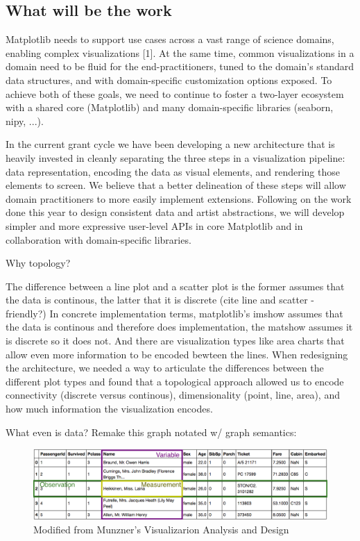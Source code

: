 \documentclass[letterpaper,onecolumn,titlepage]{Ythesis}
\begin{document}
 \subsection{What will be the work}
 Matplotlib needs to support use cases across a vast range of science domains, enabling complex visualizations [1]. At the same time, common visualizations in a domain need to be fluid for the end-practitioners, tuned to the domain's standard data structures, and with domain-specific customization options exposed. To achieve both of these goals, we need to continue to foster a two-layer ecosystem with a shared core (Matplotlib) and many domain-specific libraries (seaborn, nipy, ...).

In the current grant cycle we have been developing a new architecture that is heavily invested in cleanly separating the three steps in a visualization pipeline: data representation, encoding the data as visual elements, and rendering those elements to screen. We believe that a better delineation of these steps will allow domain practitioners to more easily implement extensions. Following on the work done this year to design consistent data and artist abstractions, we will develop simpler and more expressive user-level APIs in core Matplotlib and in collaboration with domain-specific libraries. 



 Why topology?

 The difference between a line plot and a scatter plot is the former assumes that the data is continous, the latter that it is discrete (cite line and scatter - friendly?) In concrete implementation terms, matplotlib's imshow assumes that the data is continous and therefore does implementation, the matshow assumes it is discrete so it does not. And there are visualization types like area charts that allow even more information to be encoded bewteen the lines. When redesigning the architecture, we needed a way to articulate the differences between the different plot types and found that a topological approach allowed us to encode connectivity (discrete versus continous), dimensionality (point, line, area), and how much information the visualization encodes. 

 What even is data?
 Remake this graph notated w/ graph semantics:
 \begin{figure}
    \includegraphics{figures/intro/data_formatting}
    \caption{Modified from Munzner's Visualizarion Analysis and Design}
 \end{figure}
\end{document}
